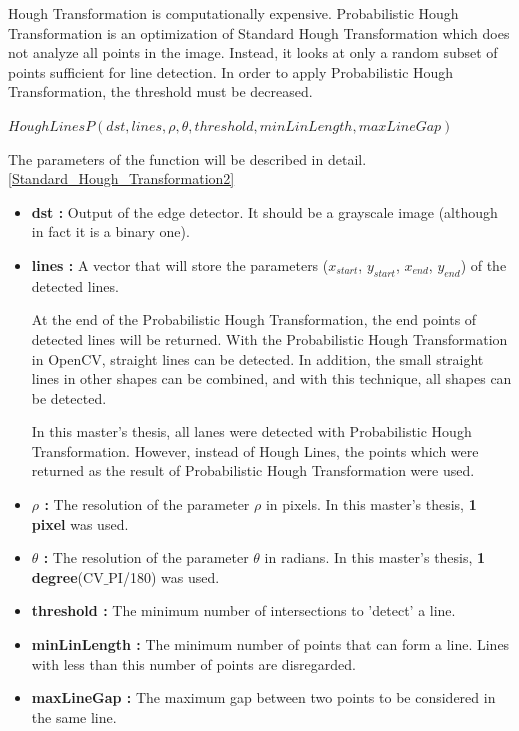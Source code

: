 Hough Transformation is computationally expensive. Probabilistic Hough Transformation is an optimization of Standard Hough Transformation which does not analyze all points in the image. Instead, it looks at only a random subset of points sufficient for line detection. In order to apply Probabilistic Hough Transformation, the threshold must be decreased.

  \begin{center}
  
$HoughLinesP(dst, lines, \rho, \theta, threshold, minLinLength, maxLineGap )  $

  \end{center}

The parameters of the function will be described in detail.\ref{Standard_Hough_Transformation2}
 
\begin{itemize}

\item \textbf{dst : }Output of the edge detector. It should be a grayscale image (although in fact it is a binary one).
 
\item \textbf{lines : }A vector that will store the parameters ($ x_{start} $, $ y_{start} $, $ x_{end} $, $ y_{end} $) of the detected lines.

At the end of the Probabilistic Hough Transformation, the end points of detected lines will be returned. With the Probabilistic Hough Transformation in OpenCV, straight lines can be detected. In addition, the small straight lines in other shapes can be combined, and with this technique, all shapes can be detected.  

In this master's thesis, all lanes were detected with Probabilistic Hough Transformation. However, instead of Hough Lines, the points which were returned as the result of Probabilistic Hough Transformation were used.

\item \textbf{$ \rho $ : }The resolution of the parameter $ \rho $ in pixels. In this master's thesis, \textbf{1 pixel} was used.

\item \textbf{$ \theta $ : }The resolution of the parameter $ \theta $ in radians. In this master's thesis, \textbf{1 degree}(CV$ \_ $PI/180) was used.

\item \textbf{threshold : }The minimum number of intersections to 'detect' a line.

\item \textbf{minLinLength : }The minimum number of points that can form a line. Lines with less than this number of points are disregarded.

\item \textbf{maxLineGap : }The maximum gap between two points to be considered in the same line.

\end{itemize}



